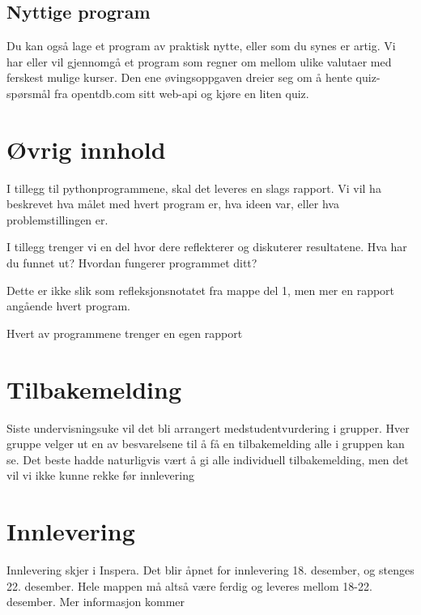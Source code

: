 \documentclass[12pt, titlepage]{article}
\begin{document}
\subsection*{Nyttige program}

Du kan også lage et program av praktisk nytte, eller som du synes er artig. Vi har eller vil gjennomgå et program som regner om mellom ulike valutaer med ferskest mulige kurser.
Den ene øvingsoppgaven dreier seg om å hente quiz-spørsmål fra opentdb.com sitt web-api og kjøre en liten quiz. 


\section*{Øvrig innhold}

I tillegg til pythonprogrammene, skal det leveres en slags rapport.
Vi vil ha beskrevet hva målet med hvert program er, hva ideen var, eller hva problemstillingen er.

I tillegg trenger vi en del hvor dere reflekterer og diskuterer resultatene. Hva har du funnet ut? Hvordan fungerer programmet ditt?

Dette er ikke slik som refleksjonsnotatet fra mappe del 1, men mer en rapport angående hvert program.

Hvert av programmene trenger en egen rapport



\section*{Tilbakemelding}

Siste undervisningsuke vil det bli arrangert medstudentvurdering i grupper. Hver gruppe velger ut en av besvarelsene til å få en tilbakemelding alle i gruppen kan se.
Det beste hadde naturligvis vært å gi alle individuell tilbakemelding, men det vil vi ikke kunne rekke før innlevering

\section*{Innlevering}

Innlevering skjer i Inspera. Det blir åpnet for innlevering 18. desember, og stenges 22. desember. Hele mappen må altså være ferdig og leveres mellom 18-22. desember.
Mer informasjon kommer
\end{document}
